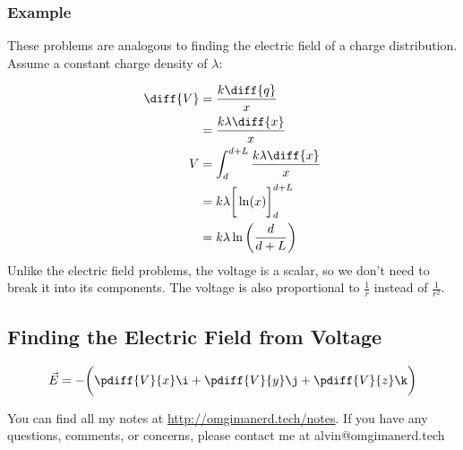 \documentclass{math}
\begin{document}
\subsubsection*{Example}
These problems are analogous to finding the electric field of a charge
distribution. Assume a constant charge density of \( \lambda \):
\begin{center}
\end{center}
\begin{align*}
  \diff{V} &= \frac{k\diff{q}}{x} \\
  &= \frac{k\lambda\diff{x}}{x} \\
  V &= \int_{d}^{d+L}\frac{k\lambda\diff{x}}{x} \\
  &= k\lambda\bigg[\ln(x)\bigg]_{d}^{d+L} \\
  &= k\lambda\ln\bigg(\frac{d}{d+L}\bigg)
\end{align*}
Unlike the electric field problems, the voltage is a scalar, so we don't need
to break it into its components. The voltage is also proportional to
\( \frac{1}{r} \) instead of \( \frac{1}{r^2} \).

\subsection*{Finding the Electric Field from Voltage}
\[ \vec{E} = -\bigg(\pdiff{V}{x}\i+\pdiff{V}{y}\j+\pdiff{V}{z}\k\bigg) \]

\begin{center}
  You can find all my notes at \url{http://omgimanerd.tech/notes}. If you have
  any questions, comments, or concerns, please contact me at
  alvin@omgimanerd.tech
\end{center}
\end{document}
